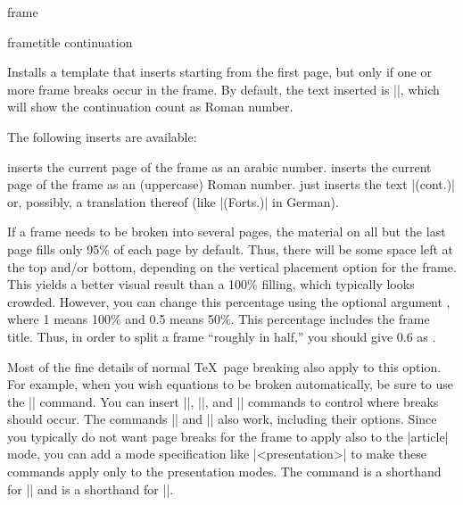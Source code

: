 \begin{environment}{{frame}}
\begin{frame}[<+->][plain]
\begin{frame}[plain]
\begin{itemize}
\begin{enumerate}
\begin{element}{frametitle continuation}
\begin{templateoptions}
          Installs a template that inserts  starting from the first page, but only if one or more frame breaks occur in the frame. By default, the text inserted is  |\insertcontinuationcountroman|,  which  will show the continuation count as Roman number.
        \end{templateoptions}
        The following inserts are available:
        \begin{templateinserts}
          \iteminsert{\insertcontinuationcount}
          inserts the current page of the frame as an arabic number.
          \iteminsert{\insertcontinuationcountroman}
          inserts the current page of the frame as an (uppercase) Roman number.
          \iteminsert{\insertcontinuationtext}
          just inserts the text |(cont.)| or, possibly, a translation thereof (like |(Forts.)| in German).
        \end{templateinserts}
      \end{element}
    \end{enumerate}

    If a frame needs to be broken into several pages, the material on all but the last page fills only 95\% of each page by default. Thus, there will be some space left at the top and/or bottom, depending on the vertical placement option for the frame. This yields a better visual result than a 100\% filling, which typically looks crowded. However, you can change this percentage using the optional argument , where 1 means 100\% and 0.5 means 50\%. This percentage includes the frame title. Thus, in order to split a frame ``roughly in half,'' you should give 0.6 as .

    Most of the fine details of normal \TeX\ page breaking also apply to this option. For example, when you wish equations to be broken automatically, be sure to use the |\allowdisplaybreaks| command. You can insert |\break|, |\nobreak|, and |\penalty| commands to control where breaks should occur. The commands |\pagebreak| and |\nopagebreak| also work, including their options. Since you typically do not want page breaks for the frame to apply also to the |article| mode, you can add a mode specification like |<presentation>| to make these commands apply only to the presentation modes. The command \declare{|\string\framebreak|} is a shorthand for || and \declare{|\string\noframebreak|} is a shorthand for ||.


\end{itemize}
\end{frame}
\end{frame}
\end{environment}
